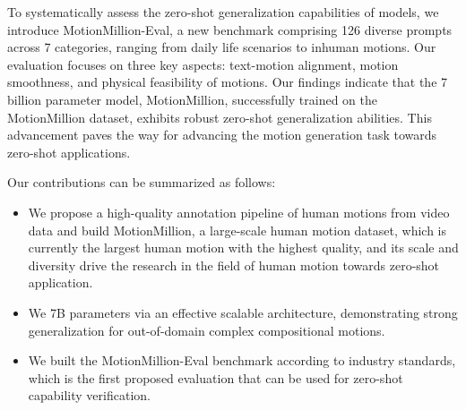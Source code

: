 To systematically assess the zero-shot generalization capabilities of models, we  introduce MotionMillion-Eval, a new benchmark comprising 126 diverse prompts across 7 categories, ranging from daily life scenarios to inhuman motions. Our evaluation focuses on three key aspects: text-motion alignment, motion smoothness, and physical feasibility of motions. Our findings indicate that the 7 billion parameter model, MotionMillion, successfully trained on the MotionMillion dataset, exhibits robust zero-shot generalization abilities. This advancement paves the way for advancing the motion generation task towards zero-shot applications. 

Our contributions can be summarized as follows:
\begin{itemize}
    \item We propose a high-quality annotation pipeline of human motions from video data and build MotionMillion, a large-scale human motion dataset, which is currently the largest human motion with the highest quality, and its scale and diversity drive the research in the field of human motion towards zero-shot application.
    \item We  7B parameters via an effective scalable architecture, demonstrating strong generalization for out-of-domain complex compositional motions.
    \item We built the MotionMillion-Eval benchmark according to industry standards, which is the first proposed evaluation that can be used for zero-shot capability verification.
\end{itemize}



